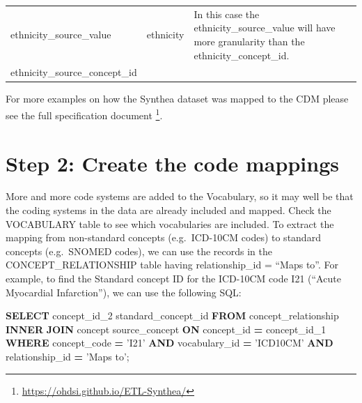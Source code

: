 \documentclass[11pt]{book}
\newenvironment{Shaded}{\begin{snugshade}}{\end{snugshade}}
\newcommand{\KeywordTok}[1]{\textcolor[rgb]{0.13,0.29,0.53}{\textbf{#1}}}
\newcommand{\NormalTok}[1]{#1}
\newcommand{\OperatorTok}[1]{\textcolor[rgb]{0.81,0.36,0.00}{\textbf{#1}}}
\newcommand{\StringTok}[1]{\textcolor[rgb]{0.31,0.60,0.02}{#1}}
\let\rmarkdownfootnote\footnote%
\def\footnote{\protect\rmarkdownfootnote}
\theoremstyle{definition}
\theoremstyle{definition}
\theoremstyle{definition}
\theoremstyle{remark}
\begin{document}
\begin{longtable}[]{@{}lll@{}}
\begin{minipage}[t]{0.28\columnwidth}
ethnicity\_source\_value\strut
\end{minipage} & \begin{minipage}[t]{0.12\columnwidth}\raggedright
ethnicity\strut
\end{minipage} & \begin{minipage}[t]{0.51\columnwidth}\raggedright
In this case the ethnicity\_source\_value will have more granularity than the ethnicity\_concept\_id.\strut
\end{minipage}\tabularnewline
\begin{minipage}[t]{0.28\columnwidth}\raggedright
ethnicity\_source\_concept\_id\strut
\end{minipage} & \begin{minipage}[t]{0.12\columnwidth}\raggedright
\strut
\end{minipage} & \begin{minipage}[t]{0.51\columnwidth}\raggedright
\strut
\end{minipage}\tabularnewline
\bottomrule
\end{longtable}

For more examples on how the Synthea dataset was mapped to the CDM please see the full specification document \footnote{\url{https://ohdsi.github.io/ETL-Synthea/}}.

\hypertarget{step-2-create-the-code-mappings}{%
\section{Step 2: Create the code mappings}\label{step-2-create-the-code-mappings}}

More and more code systems are added to the Vocabulary, so it may well be that the coding systems in the data are already included and mapped. Check the VOCABULARY table to see which vocabularies are included. To extract the mapping from non-standard concepts (e.g.~ICD-10CM codes) to standard concepts (e.g.~SNOMED codes), we can use the records in the CONCEPT\_RELATIONSHIP table having relationship\_id = ``Maps to''. For example, to find the Standard concept ID for the ICD-10CM code I21 (``Acute Myocardial Infarction''), we can use the following SQL:

\begin{Shaded}
\begin{Highlighting}[]
\KeywordTok{SELECT}\NormalTok{ concept_id_2 standard_concept_id}
\KeywordTok{FROM}\NormalTok{ concept_relationship}
\KeywordTok{INNER} \KeywordTok{JOIN}\NormalTok{ concept source_concept}
  \KeywordTok{ON}\NormalTok{ concept_id }\OperatorTok{=}\NormalTok{ concept_id_1}
\KeywordTok{WHERE}\NormalTok{ concept_code }\OperatorTok{=} \StringTok{'I21'}
  \KeywordTok{AND}\NormalTok{ vocabulary_id }\OperatorTok{=} \StringTok{'ICD10CM'}
  \KeywordTok{AND}\NormalTok{ relationship_id }\OperatorTok{=} \StringTok{'Maps to'}\NormalTok{; }
\end{Highlighting}
\end{Shaded}
\end{document}
